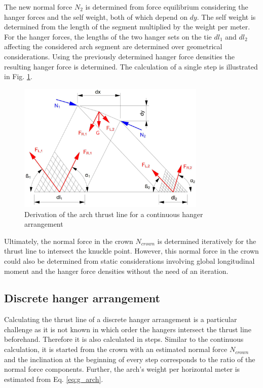 The new normal force $N_2$ is determined from force equilibrium considering the hanger forces and the self weight, both of which depend on $dy$. The self weight is determined from the length of the segment multiplied by the weight per meter. For the hanger forces, the lengths of the two hanger sets on the tie $dl_1$ and $dl_2$ affecting the considered arch segment are determined over geometrical considerations. Using the previously determined hanger force densities the resulting hanger force is determined. The calculation of a single step is illustrated in Fig. \ref{fig:continuous_2}.
\begin{figure}[H]
    \centering
    \includegraphics[width=0.8\textwidth]{overleaf/Appendix/Pictures/continuous_thrust_line.PNG}
    \caption{Derivation of the arch thrust line for a continuous hanger arrangement}
    \label{fig:continuous_2}
\end{figure}

Ultimately, the normal force in the crown $N_{crown}$ is determined iteratively for the thrust line to intersect the knuckle point. However, this normal force in the crown could also be determined from static considerations involving global longitudinal moment and the hanger force densities without the need of an iteration.


\subsection{Discrete hanger arrangement}\label{app:discrete}

Calculating the thrust line of a discrete hanger arrangement is a particular challenge as it is not known in which order the hangers intersect the thrust line beforehand. Therefore it is also calculated in steps. Similar to the continuous calculation, it is started from the crown with an estimated normal force $N_{crown}$ and the inclination at the beginning of every step corresponds to the ratio of the normal force components. Further, the arch's weight per horizontal meter is estimated from Eq. \ref{eq:g_arch}.

